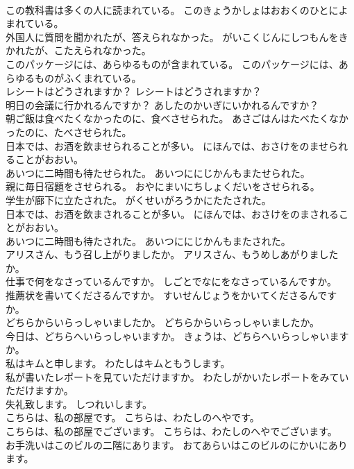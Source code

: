 \documentclass[8pt]{extreport}
\begin{document}
\begin{CJK}{UTF8}{min}
\\	この教科書は多くの人に読まれている。	このきょうかしょはおおくのひとによまれている。	
\\	外国人に質問を聞かれたが、答えられなかった。	がいこくじんにしつもんをきかれたが、こたえられなかった。	
\\	このパッケージには、あらゆるものが含まれている。	このパッケージには、あらゆるものがふくまれている。	
\\	レシートはどうされますか？	レシートはどうされますか？	
\\	明日の会議に行かれるんですか？	あしたのかいぎにいかれるんですか？	
\\	朝ご飯は食べたくなかったのに、食べさせられた。	あさごはんはたべたくなかったのに、たべさせられた。	
\\	日本では、お酒を飲ませられることが多い。	にほんでは、おさけをのませられることがおおい。	
\\	あいつに二時間も待たせられた。	あいつににじかんもまたせられた。	
\\	親に毎日宿題をさせられる。	おやにまいにちしょくだいをさせられる。	
\\	学生が廊下に立たされた。	がくせいがろうかにたたされた。	
\\	日本では、お酒を飲まされることが多い。	にほんでは、おさけをのまされることがおおい。	
\\	あいつに二時間も待たされた。	あいつににじかんもまたされた。	
\\	アリスさん、もう召し上がりましたか。	アリスさん、もうめしあがりましたか。	
\\	仕事で何をなさっているんですか。	しごとでなにをなさっているんですか。	
\\	推薦状を書いてくださるんですか。	すいせんじょうをかいてくださるんですか。	
\\	どちらからいらっしゃいましたか。	どちらからいらっしゃいましたか。	
\\	今日は、どちらへいらっしゃいますか。	きょうは、どちらへいらっしゃいますか。	
\\	私はキムと申します。	わたしはキムともうします。	
\\	私が書いたレポートを見ていただけますか。	わたしがかいたレポートをみていただけますか。	
\\	失礼致します。	しつれいします。	
\\	こちらは、私の部屋です。	こちらは、わたしのへやです。	
\\	こちらは、私の部屋でございます。	こちらは、わたしのへやでございます。	
\\	お手洗いはこのビルの二階にあります。	おてあらいはこのビルのにかいにあります。	

\end{CJK}
\end{document}
